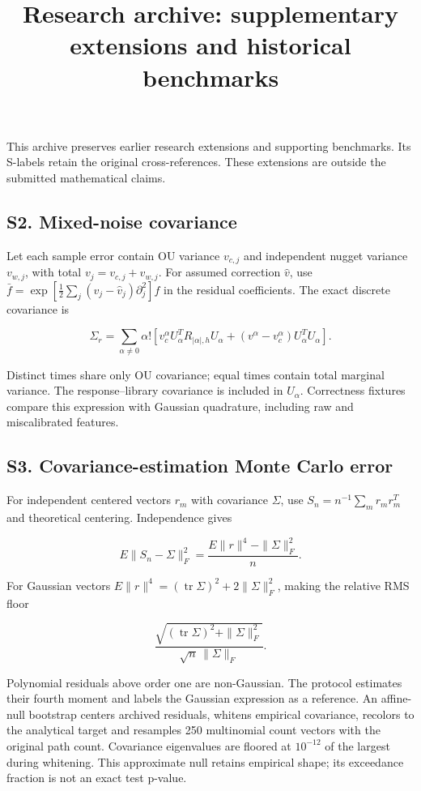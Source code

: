 \documentclass[
  american,
  11pt,
]{article}
\title{Research archive: supplementary extensions and historical
benchmarks}
\author{}
\date{}
\begin{document}
\maketitle

This archive preserves earlier research extensions and supporting
benchmarks. Its S-labels retain the original cross-references. These
extensions are outside the submitted mathematical claims.

\subsection{S2. Mixed-noise
covariance}\label{s2.-mixed-noise-covariance}

Let each sample error contain OU variance \(v_{c,j}\) and independent
nugget variance \(v_{w,j}\), with total \(v_j=v_{c,j}+v_{w,j}\). For
assumed correction \(\widehat v\), use
\(\bar f=\exp[\frac12\sum_j(v_j-\widehat v_j)\partial_j^2]f\) in the
residual coefficients. The exact discrete covariance is

\[
\Sigma_r=\sum_{\alpha\ne0}\alpha!\left[
v_c^\alpha U_\alpha^TR_{|\alpha|,h}U_\alpha+
(v^\alpha-v_c^\alpha)U_\alpha^TU_\alpha\right].
\]

Distinct times share only OU covariance; equal times contain total
marginal variance. The response--library covariance is included in
\(U_\alpha\). Correctness fixtures compare this expression with Gaussian
quadrature, including raw and miscalibrated features.

\subsection{S3. Covariance-estimation Monte Carlo
error}\label{s3.-covariance-estimation-monte-carlo-error}

For independent centered vectors \(r_m\) with covariance \(\Sigma\), use
\(S_n=n^{-1}\sum_mr_mr_m^T\) and theoretical centering. Independence
gives

\[
E\|S_n-\Sigma\|_F^2=\frac{E\|r\|^4-\|\Sigma\|_F^2}{n}.
\]

For Gaussian vectors
\(E\|r\|^4=(\operatorname{tr}\Sigma)^2+2\|\Sigma\|_F^2\), making the
relative RMS floor

\[
\frac{\sqrt{(\operatorname{tr}\Sigma)^2+\|\Sigma\|_F^2}}{\sqrt n\,\|\Sigma\|_F}.
\]

Polynomial residuals above order one are non-Gaussian. The protocol
estimates their fourth moment and labels the Gaussian expression as a
reference. An affine-null bootstrap centers archived residuals, whitens
empirical covariance, recolors to the analytical target and resamples
250 multinomial count vectors with the original path count. Covariance
eigenvalues are floored at \(10^{-12}\) of the largest during whitening.
This approximate null retains empirical shape; its exceedance fraction
is not an exact test p-value.
\end{document}

